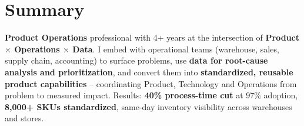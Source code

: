 
\section{Summary}
\textbf{Product Operations} professional with 4+ years at the intersection of \textbf{Product $\times$ Operations $\times$ Data}. I embed with operational teams (warehouse, sales, supply chain, accounting) to surface problems, use \textbf{data for root-cause analysis and prioritization}, and convert them into \textbf{standardized, reusable product capabilities} -- coordinating Product, Technology and Operations from problem to measured impact. Results: \textbf{40\% process-time cut} at 97\% adoption, \textbf{8{,}000+ SKUs standardized}, same-day inventory visibility across warehouses and stores.
